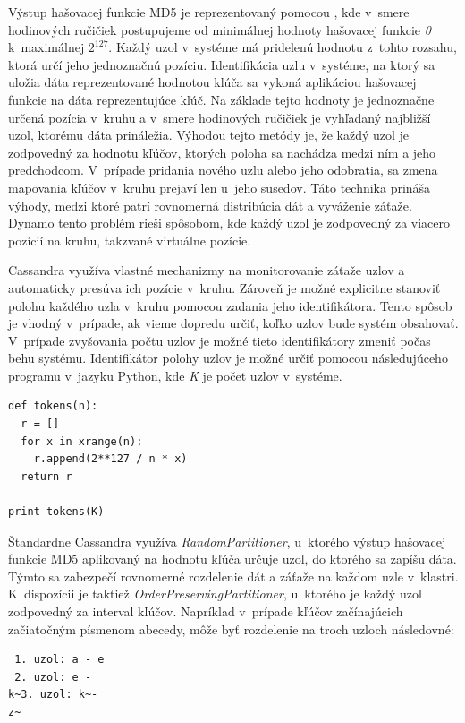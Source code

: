 \documentclass[11pt,twoside,a4paper]{book}
\begin{document}
Výstup hašovacej funkcie MD5 je reprezentovaný pomocou , kde v~smere hodinových ručičiek postupujeme od minimálnej hodnoty hašovacej funkcie \textit{0} k~maximálnej ${2^{127}}$. Každý uzol v~systéme má pridelenú hodnotu z~tohto rozsahu, ktorá určí jeho jednoznačnú pozíciu. Identifikácia uzlu v~systéme, na ktorý sa uložia dáta reprezentované hodnotou kľúča sa vykoná aplikáciou hašovacej funkcie na dáta reprezentujúce kľúč. Na základe tejto hodnoty je jednoznačne určená pozícia v~kruhu a v~smere hodinových ručičiek je vyhľadaný najbližší uzol, ktorému dáta prináležia. Výhodou tejto metódy je, že každý uzol je zodpovedný za hodnotu kľúčov, ktorých poloha sa nachádza medzi ním a jeho predchodcom. V~prípade pridania nového uzlu alebo jeho odobratia, sa zmena mapovania kľúčov v~kruhu prejaví len u~jeho susedov. Táto technika prináša výhody, medzi ktoré patrí rovnomerná distribúcia dát a vyváženie záťaže. Dynamo tento problém rieši spôsobom, kde každý uzol je zodpovedný za viacero pozícií na kruhu, takzvané virtuálne pozície. 

Cassandra využíva vlastné mechanizmy na monitorovanie záťaže uzlov a automaticky presúva ich pozície v~kruhu. Zároveň je možné explicitne stanoviť polohu každého uzla v~kruhu pomocou zadania jeho identifikátora. Tento spôsob je vhodný v~prípade, ak vieme dopredu určiť, koľko uzlov bude systém obsahovať. V~prípade zvyšovania počtu uzlov je možné tieto identifikátory zmeniť počas behu systému. Identifikátor polohy uzlov je možné určiť pomocou následujúceho programu v~jazyku Python, kde \emph{K} je počet uzlov v~systéme.

\begin{verbatim}
def tokens(n):
  r = []
  for x in xrange(n):
    r.append(2**127 / n * x)
  return r

print tokens(K)
\end{verbatim}

Štandardne Cassandra využíva \emph{RandomPartitioner}, u~ktorého výstup hašovacej funkcie MD5 aplikovaný na hodnotu kľúča určuje uzol, do ktorého sa zapíšu dáta. Týmto sa zabezpečí rovnomerné rozdelenie dát a záťaže na každom uzle v~klastri. K~dispozícii je taktiež \emph{OrderPreservingPartitioner}, u~ktorého je každý uzol zodpovedný za interval kľúčov. Napríklad v~prípade kľúčov začínajúcich začiatočným písmenom abecedy, môže byť rozdelenie na troch uzloch následovné:
\begin{verbatim}
 1. uzol: a - e
 2. uzol: e -
k~3. uzol: k~-
z~\end{verbatim}
\end{document}
